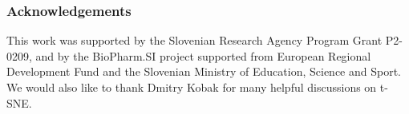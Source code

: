 \documentclass[runningheads]{llncs}
\begin{document}
\subsubsection*{Acknowledgements}

This work was supported by the Slovenian Research Agency Program Grant P2-0209,
and by the BioPharm.SI project supported from European Regional Development
Fund and the Slovenian Ministry of Education, Science and Sport. We would also
like to thank Dmitry Kobak for many helpful discussions on t-SNE.

% 


\end{document}
